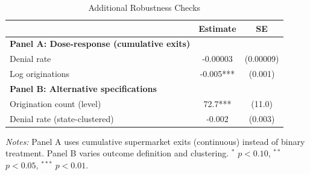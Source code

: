 \begin{table}[htbp]
\centering
\caption{Additional Robustness Checks}
\label{tab:robust}
\begin{tabular}{lcc}
\toprule
 & Estimate & SE \\
\midrule
\textbf{Panel A: Dose-response (cumulative exits)} & & \\
\quad Denial rate & -0.00003 & (0.00009) \\
\quad Log originations & -0.005*** & (0.001) \\
\addlinespace
\textbf{Panel B: Alternative specifications} & & \\
\quad Origination count (level) & 72.7*** & (11.0) \\
\quad Denial rate (state-clustered) & -0.002 & (0.003) \\
\bottomrule
\end{tabular}
\begin{tablenotes}
\item \textit{Notes:} Panel A uses cumulative supermarket exits (continuous) instead of binary treatment.
Panel B varies outcome definition and clustering.
$^{*}$ $p < 0.10$, $^{**}$ $p < 0.05$, $^{***}$ $p < 0.01$.
\end{tablenotes}
\end{table}
